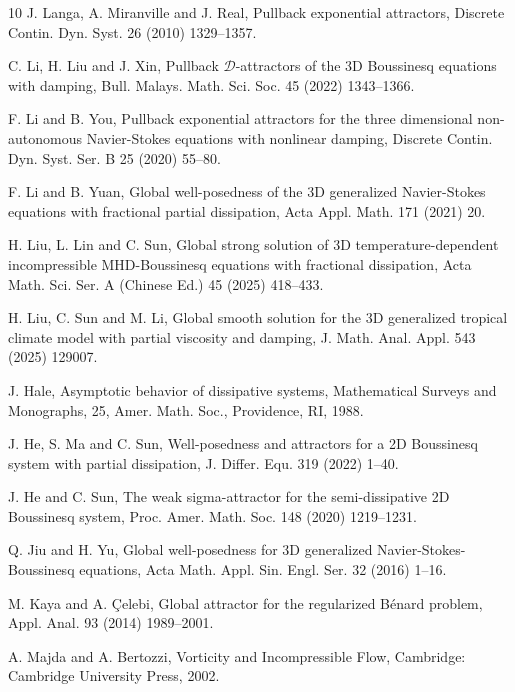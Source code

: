 \documentclass[oneside,preprint,12pt,numbers,sort&compress]{elsarticle}
\begin{document}
\begin{thebibliography}{10}
J. Langa, A. Miranville and J. Real, Pullback exponential attractors, Discrete Contin. Dyn. Syst. 26 (2010) 1329--1357.%

C. Li, H. Liu and J. Xin, Pullback $\mathcal{D}$-attractors of the 3D Boussinesq equations with damping, Bull. Malays. Math. Sci. Soc. 45 (2022) 1343--1366.%

F. Li and B. You, Pullback exponential attractors for the three dimensional non-autonomous Navier-Stokes equations with nonlinear damping, Discrete Contin. Dyn. Syst. Ser. B 25 (2020) 55--80. %

F. Li and B. Yuan, Global well-posedness of the 3D generalized Navier-Stokes equations with fractional partial dissipation, Acta Appl. Math. 171 (2021) 20.%

H. Liu, L. Lin and C. Sun, Global strong solution of 3D temperature-dependent incompressible MHD-Boussinesq equations with fractional dissipation, Acta Math. Sci. Ser. A (Chinese Ed.) 45 (2025) 418--433.%

H. Liu, C. Sun and M. Li, Global smooth solution for the 3D generalized tropical climate model with partial viscosity and damping, J. Math. Anal. Appl. 543 (2025) 129007.%

J. Hale, Asymptotic behavior of dissipative systems, Mathematical Surveys and Monographs, 25, Amer. Math. Soc., Providence, RI, 1988. %

J. He, S. Ma and C. Sun, Well-posedness and attractors for a 2D Boussinesq system with partial dissipation, J. Differ. Equ. 319 (2022) 1--40.%

J. He and C. Sun, The weak sigma-attractor for the semi-dissipative 2D Boussinesq system, Proc. Amer. Math. Soc. 148 (2020) 1219--1231.%

Q. Jiu and H. Yu, Global well-posedness for 3D generalized Navier-Stokes-Boussinesq equations, Acta Math. Appl. Sin. Engl. Ser. 32 (2016) 1--16. %

M. Kaya and A. \c Celebi, Global attractor for the regularized B\'enard problem, Appl. Anal. 93 (2014) 1989--2001.%

A. Majda and A. Bertozzi, Vorticity and Incompressible Flow, Cambridge: Cambridge University Press, 2002.


\end{thebibliography}
\end{document}
